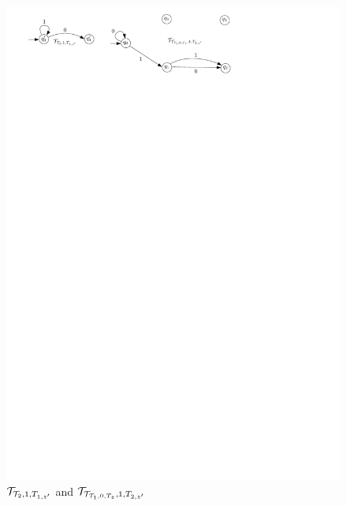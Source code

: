 \begin{example}
\begin{figure}[htbp]
\begin{center}
\includegraphics[scale=0.8]{single-letter-example-nested-2.pdf}
\end{center}
\caption{$\mathcal{T}_{\mathcal{T}_2, 1, T_{1,z'}}$ and $\mathcal{T}_{\mathcal{T}_{\mathcal{T}_1, 0, T_z}, 1, T_{2,z'}}$}\label{fig-sl-exmp-nested-2}
\end{figure}
\end{example}